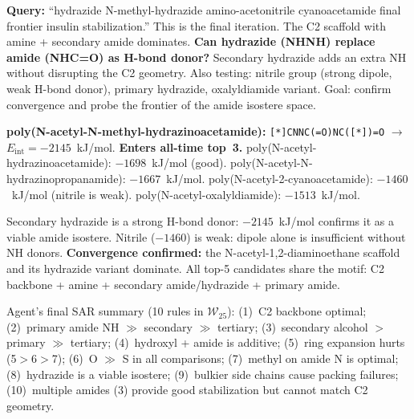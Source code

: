 \documentclass[twocolumn]{fairmeta}
\begin{document}
\begin{agentthought}
\scriptsize
\textbf{Query:} ``hydrazide N-methyl-hydrazide amino-acetonitrile cyanoacetamide final frontier insulin stabilization.''
This is the final iteration. The C2 scaffold with amine + secondary amide dominates.
\textbf{Can hydrazide (NHNH) replace amide (NHC=O) as H-bond donor?}
Secondary hydrazide adds an extra NH without disrupting the C2 geometry.
Also testing: nitrile group (strong dipole, weak H-bond donor), primary hydrazide, oxalyldiamide variant.
Goal: confirm convergence and probe the frontier of the amide isostere space.
\end{agentthought}

\begin{toolcall}
\scriptsize
\textbf{poly(N-acetyl-N-methyl-hydrazinoacetamide):} \texttt{[*]CNNC(=O)NC([*])=O} $\to$ $E_\text{int} = -2145$~kJ/mol. \textbf{Enters all-time top~3.}
poly(N-acetyl-hydrazinoacetamide): $-1698$~kJ/mol (good).
poly(N-acetyl-N-hydrazinopropanamide): $-1667$~kJ/mol.
poly(N-acetyl-2-cyanoacetamide): $-1460$~kJ/mol (nitrile is weak).
poly(N-acetyl-oxalyldiamide): $-1513$~kJ/mol.
\end{toolcall}

\begin{observation}
\scriptsize
Secondary hydrazide is a strong H-bond donor: $-2145$~kJ/mol confirms it as a viable amide isostere.
Nitrile ($-1460$) is weak: dipole alone is insufficient without NH donors.
\textbf{Convergence confirmed:} the N-acetyl-1,2-diaminoethane scaffold and its hydrazide variant dominate.
All top-5 candidates share the motif: C2 backbone + amine + secondary amide/hydrazide + primary amide.

Agent's final SAR summary (10 rules in $\mathcal{W}_{25}$): (1)~C2 backbone optimal; (2)~primary amide NH $\gg$ secondary $\gg$ tertiary; (3)~secondary alcohol $>$ primary $\gg$ tertiary; (4)~hydroxyl + amide is additive; (5)~ring expansion hurts (5$>$6$>$7); (6)~O $\gg$ S in all comparisons; (7)~methyl on amide N is optimal; (8)~hydrazide is a viable isostere; (9)~bulkier side chains cause packing failures; (10)~multiple amides (3) provide good stabilization but cannot match C2 geometry.
\end{observation}
\end{document}
